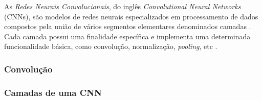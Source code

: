 As \textit{Redes Neurais Convolucionais}, do inglês \textit{Convolutional Neural Networks} (CNNs), são modelos de redes neurais especializados em processamento de dados compostos pela união de vários segmentos elementares denominados camadas \cite{ref:goodfellow}. Cada camada possui uma finalidade específica e implementa uma determinada funcionalidade básica, como convolução, normalização, \textit{pooling}, etc \cite{ref:khan}.

\subsubsection{Convolução} \label{subsubsec:convolucao}


\subsubsection{Camadas de uma CNN} \label{subsubsec:camadas}
